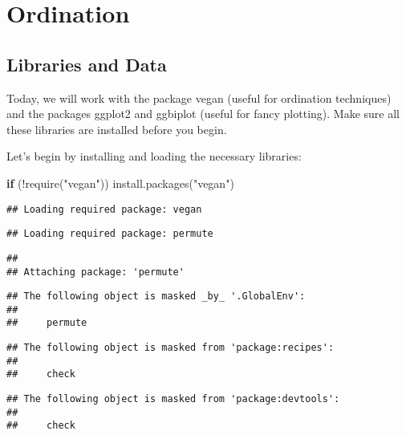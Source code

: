 \documentclass[
]{book}
\newenvironment{Shaded}{\begin{snugshade}}{\end{snugshade}}
\newcommand{\ControlFlowTok}[1]{\textcolor[rgb]{0.13,0.29,0.53}{\textbf{#1}}}
\newcommand{\FunctionTok}[1]{\textcolor[rgb]{0.00,0.00,0.00}{#1}}
\newcommand{\NormalTok}[1]{#1}
\newcommand{\SpecialCharTok}[1]{\textcolor[rgb]{0.00,0.00,0.00}{#1}}
\newcommand{\StringTok}[1]{\textcolor[rgb]{0.31,0.60,0.02}{#1}}
\begin{document}
\hypertarget{ordination}{%
\chapter{Ordination}\label{ordination}}

\hypertarget{libraries-and-data}{%
\section{Libraries and Data}\label{libraries-and-data}}

Today, we will work with the package vegan (useful for ordination techniques) and the packages ggplot2 and ggbiplot (useful for fancy plotting). Make sure all these libraries are installed before you begin.

Let's begin by installing and loading the necessary libraries:

\begin{Shaded}
\begin{Highlighting}[]
\ControlFlowTok{if}\NormalTok{ (}\SpecialCharTok{!}\FunctionTok{require}\NormalTok{(}\StringTok{"vegan"}\NormalTok{)) }\FunctionTok{install.packages}\NormalTok{(}\StringTok{"vegan"}\NormalTok{)}
\end{Highlighting}
\end{Shaded}

\begin{verbatim}
## Loading required package: vegan
\end{verbatim}

\begin{verbatim}
## Loading required package: permute
\end{verbatim}

\begin{verbatim}
## 
## Attaching package: 'permute'
\end{verbatim}

\begin{verbatim}
## The following object is masked _by_ '.GlobalEnv':
## 
##     permute
\end{verbatim}

\begin{verbatim}
## The following object is masked from 'package:recipes':
## 
##     check
\end{verbatim}

\begin{verbatim}
## The following object is masked from 'package:devtools':
## 
##     check
\end{verbatim}
\end{document}

